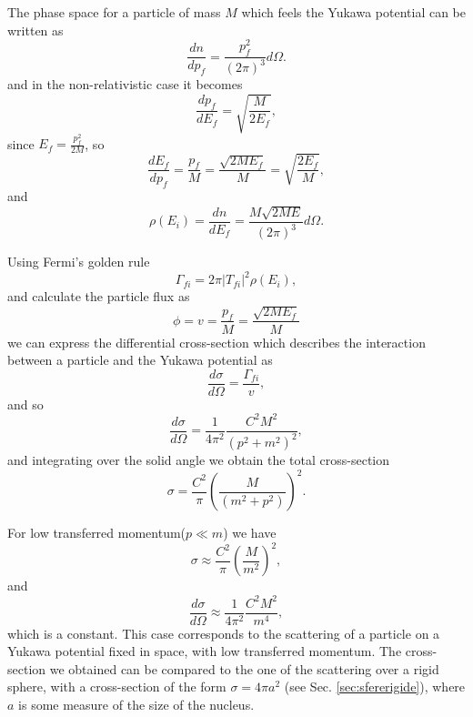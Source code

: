The phase space for a particle of mass $M$ which feels the Yukawa potential can be written as
\begin{equation*}
    \frac{dn}{dp_f} = \frac{p_f^2}{(2\pi)^3}d\Omega.
\end{equation*}
and in the non-relativistic case it becomes
\begin{equation*}
    \frac{dp_f}{dE_f} = \sqrt{\frac{M}{2E_f}},
\end{equation*}
since $E_f = \frac{p_f^2}{2M}$, so
\begin{equation*}
    \frac{dE_f}{dp_f} = \frac{p_f}{M} = \frac{\sqrt{2ME_f}}{M} = \sqrt{\frac{2E_f}{M}},
\end{equation*}
and
\begin{equation*}
    \rho(E_i)=\frac{dn}{dE_f} = \frac{M\sqrt{2ME}}{(2\pi)^3}d\Omega.
\end{equation*}

Using  Fermi's golden rule
\begin{equation*}
    \Gamma_{fi} = 2\pi|T_{fi}|^2\rho(E_i),
\end{equation*}
and calculate the particle flux as
\begin{equation*}
    \phi=v=\frac{p_{f}}{M}=\frac{\sqrt{2ME_{f}}}{M}
\end{equation*}
we can express the differential cross-section which describes the interaction between a particle and the Yukawa potential as
\begin{equation*}
    \frac{d\sigma}{d\Omega} =\frac{\Gamma_{fi}}{v},
\end{equation*}
and so
\begin{equation*}
    \frac{d\sigma}{d\Omega} = \frac{1}{4\pi^2}\frac{C^2M^2}{(p^2+m^2)^2},
\end{equation*}
and integrating over the solid angle we obtain the total cross-section
\begin{equation}
    \sigma = \frac{C^2}{\pi}\left(\frac{M}{(m^2+p^2)}\right)^2.
\end{equation}

For low transferred momentum($p\ll m$) we have
\begin{equation}
    \label{eq:xsec-yukawa1}
    \sigma \approx \frac{C^2}{\pi}\left(\frac{M}{m^2}\right)^2,
\end{equation}
and 
\begin{equation*}
    \frac{d\sigma}{d\Omega} \approx \frac{1}{4\pi^2}\frac{C^2M^2}{m^4},
\end{equation*}
which is a constant. This case corresponds to the scattering of a particle on a Yukawa potential fixed in space, with low transferred momentum.
The  cross-section we obtained can be compared to the one of the scattering over a rigid sphere, with a cross-section of the form $\sigma = 4\pi a^2 $ (see Sec. \ref{sec:sfererigide}), where $a$ is some measure of the size of the nucleus.

